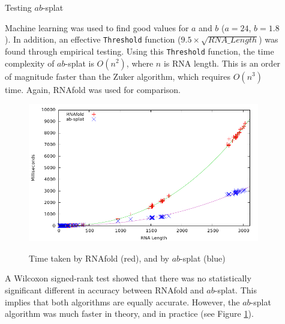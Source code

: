 \documentclass[final]{beamer}
\newlength{\sepwid}
\newlength{\onecolwid}
\begin{document}
\begin{frame}[t]
\begin{columns}[t]
\begin{column}{\onecolwid}
    
    \end{column}    
    
    

 \begin{column}{\sepwid}\end{column}			%
    \begin{column}{\onecolwid}
    
        \begin{block}{Testing $ab$-splat}


Machine learning was used to find good values for $a$ and $b$ ($a = 24$, $b = 1.8$). In addition, an effective \texttt{Threshold} function ($9.5 \times \sqrt{RNA\_Length}$) was found through empirical testing. Using this \texttt{Threshold} function, the time complexity of $ab$-splat is $O(n^2)$, where $n$ is RNA length. This is an order of magnitude faster than the Zuker algorithm, which requires $O(n^3)$ time. Again, RNAfold was used for comparison.
       \vspace{0.25in}
        \begin{figure}
          \begin{center}
            \includegraphics[width=10in]{zukerabtime.pdf} \\
            \caption{Time taken by RNAfold (red), and by $ab$-splat (blue)}
            \label{fig:zukerabtime}
          \end{center}
        \end{figure}
A Wilcoxon signed-rank test showed that there was no statistically significant different in accuracy between RNAfold and $ab$-splat. This implies that both algorithms are equally accurate. However, the $ab$-splat algorithm was much faster in theory, and in practice (see Figure \ref{fig:zukerabtime}).   
         

\end{block}
\end{column}
\end{columns}
\end{frame}
\end{document}
